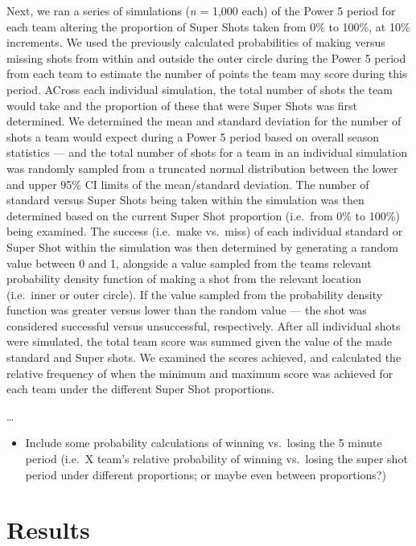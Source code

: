 \documentclass[]{elsarticle} %
\providecommand{\tightlist}{%
  \setlength{\itemsep}{0pt}\setlength{\parskip}{0pt}}
\begin{document}
Next, we ran a series of simulations (\emph{n} = 1,000 each) of the
Power 5 period for each team altering the proportion of Super Shots
taken from 0\% to 100\%, at 10\% increments. We used the previously
calculated probabilities of making versus missing shots from within and
outside the outer circle during the Power 5 period from each team to
estimate the number of points the team may score during this period.
ACross each individual simulation, the total number of shots the team
would take and the proportion of these that were Super Shots was first
determined. We determined the mean and standard deviation for the number
of shots a team would expect during a Power 5 period based on overall
season statistics --- and the total number of shots for a team in an
individual simulation was randomly sampled from a truncated normal
distribution between the lower and upper 95\% CI limits of the
mean/standard deviation. The number of standard versus Super Shots being
taken within the simulation was then determined based on the current
Super Shot proportion (i.e.~from 0\% to 100\%) being examined. The
success (i.e.~make vs.~miss) of each individual standard or Super Shot
within the simulation was then determined by generating a random value
between 0 and 1, alongside a value sampled from the teams relevant
probability density function of making a shot from the relevant location
(i.e.~inner or outer circle). If the value sampled from the probability
density function was greater versus lower than the random value --- the
shot was considered successful versus unsuccessful, respectively. After
all individual shots were simulated, the total team score was summed
given the value of the made standard and Super shots. We examined the
scores achieved, and calculated the relative frequency of when the
minimum and maximum score was achieved for each team under the different
Super Shot proportions.

\ldots{}

\begin{itemize}
\tightlist
\item
  Include some probability calculations of winning vs.~losing the 5
  minute period (i.e.~X team's relative probability of winning
  vs.~losing the super shot period under different proportions; or maybe
  even between proportions?)
\end{itemize}

\hypertarget{results}{%
\section{Results}\label{results}}
\end{document}
